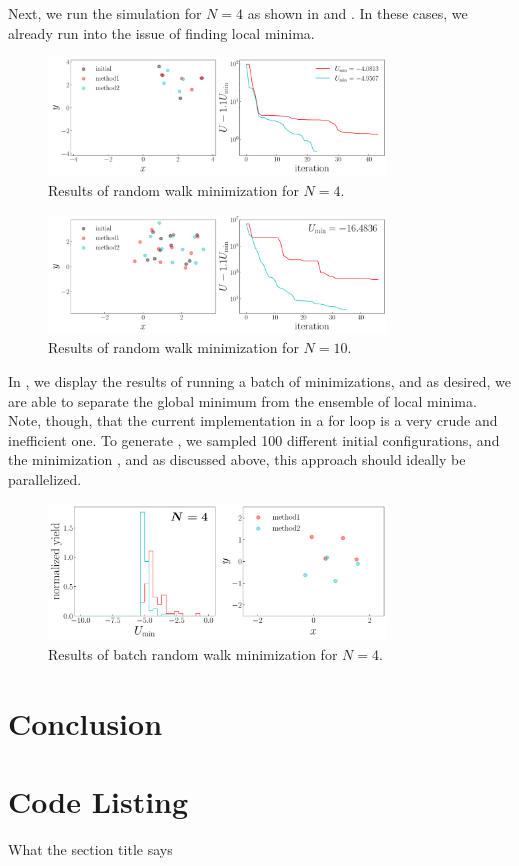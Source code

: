 Next, we run the simulation for $N = 4$ as shown in  and .
In these cases, we already run into the issue of finding local minima.

\begin{figure}[h!tb]
    \centering
    \includegraphics[width=0.8\textwidth]{track_min4.pdf}
    \caption{Results of random walk minimization for $N =4$.}
    \label{fig:track-min4}
\end{figure}

\begin{figure}[h!tb]
    \centering
    \includegraphics[width=0.8\textwidth]{track_min10.pdf}
    \caption{Results of random walk minimization for $N = 10$.}
    \label{fig:track-min10}
\end{figure}

In , we display the results of running a batch of minimizations, and as desired, we are able to separate the global minimum from the ensemble of local minima.
Note, though, that the current implementation in a for loop is a very crude and inefficient one.
To generate , we sampled 100 different initial configurations, and the minimization 
, and as discussed above, this approach should ideally be parallelized.

\begin{figure}[h!tb]
    \centering
    \includegraphics[width=0.8\textwidth]{batch_min4.pdf}
    \caption{Results of batch random walk minimization for $N = 4$.}
    \label{fig:batch-min4}
\end{figure}


\section{Conclusion}



\appendix

\section{Code Listing}
\label{app:code-listing}

What the section title says

    


